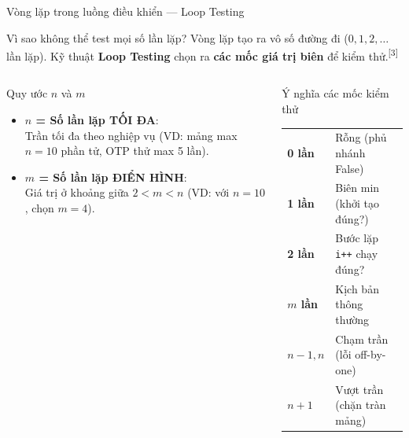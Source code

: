 \documentclass[aspectratio=169,12pt]{beamer}
\newcommand{\sref}[1]{\textsuperscript{\scriptsize[#1]}}
\begin{document}
\begin{frame}[shrink=12]{Vòng lặp trong luồng điều khiển --- Loop Testing}
  \begin{block}{Vì sao không thể test mọi số lần lặp?}
    Vòng lặp tạo ra vô số đường đi ($0, 1, 2, \dots$ lần lặp). Kỹ thuật \textbf{Loop Testing} chọn ra \textbf{các mốc giá trị biên} để kiểm thử.\sref{3}
  \end{block}

  \vspace{0.1em}
  \begin{columns}[T]
    \begin{block}{\small Quy ước $n$ và $m$}
      \small
      \begin{itemize}\setlength{\itemsep}{0.25em}
        \item \textbf{$n$ = Số lần lặp TỐI ĐA}:\\
          {\footnotesize Trần tối đa theo nghiệp vụ (VD: mảng max $n = 10$ phần tử, OTP thử max 5 lần).}
        \item \textbf{$m$ = Số lần lặp ĐIỂN HÌNH}:\\
          {\footnotesize Giá trị ở khoảng giữa $2 < m < n$ (VD: với $n = 10$, chọn $m = 4$).}
      \end{itemize}
    \end{block}

    \begin{exampleblock}{\small Ý nghĩa các mốc kiểm thử}
      \small
      \renewcommand{\arraystretch}{1.15}
      \begin{tabular}{ll}
        \textbf{0 lần} & Rỗng (phủ nhánh False) \\
        \textbf{1 lần} & Biên min (khởi tạo đúng?) \\
        \textbf{2 lần} & Bước lặp \texttt{i++} chạy đúng? \\
        \textbf{$m$ lần} & Kịch bản thông thường \\
        \textbf{$n-1, n$} & Chạm trần (lỗi off-by-one) \\
        \textbf{$n+1$} & Vượt trần (chặn tràn mảng) \\
      \end{tabular}
      \renewcommand{\arraystretch}{1}
    \end{exampleblock}
  \end{columns}
\end{frame}
\end{document}

